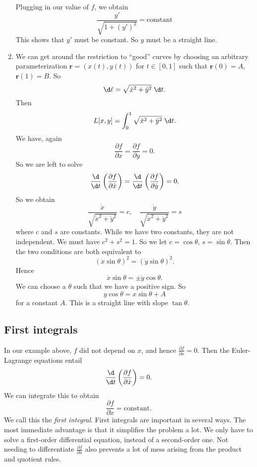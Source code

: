 \documentclass[a4paper]{article}
\begin{document}
\begin{eg}
\begin{enumerate}
      Plugging in our value of $f$, we obtain
      \[
        \frac{y'}{\sqrt{1 + (y')^2}} = \text{constant}
      \]
      This shows that $y'$ must be constant. So $y$ must be a straight line.
    \item We can get around the restriction to ``good'' curves by choosing an arbitrary parameterization $\mathbf{r} = (x(t), y(t))$ for $t\in [0, 1]$ such that $\mathbf{r}(0) = A$, $\mathbf{r}(1) = B$. So
      \[
        \d \ell = \sqrt{\dot x^2 + \dot y^2}\;\d t.
      \]
      Then
      \[
        L[x, y] = \int_0^1 \sqrt{\dot x^2 + \dot y^2} \;\d t.
      \]
      We have, again
      \[
        \frac{\partial f}{\partial x} = \frac{\partial f}{\partial y} = 0.
      \]
      So we are left to solve
      \[
        \frac{\d }{\d t}\left(\frac{\partial f}{\partial \dot x}\right) = \frac{\d }{\d t}\left(\frac{\partial f}{\partial \dot y}\right)  = 0.
      \]
      So we obtain
      \[
        \frac{\dot x}{\sqrt{\dot x^2 + \dot y^2}} = c,\quad \frac{\dot y}{\sqrt{\dot x^2 + \dot y^2}} = s
      \]
      where $c$ and $s$ are constants. While we have two constants, they are not independent. We must have $c^2 + s^2 = 1$. So we let $c = \cos \theta$, $s = \sin \theta$. Then the two conditions are both equivalent to
      \[
        (\dot x \sin \theta)^2 = (\dot y\sin \theta)^2.
      \]
      Hence
      \[
        \dot x \sin \theta = \pm\dot y \cos \theta.
      \]
      We can choose a $\theta$ such that we have a positive sign. So
      \[
        y\cos \theta = x\sin \theta + A
      \]
      for a constant $A$. This is a straight line with slope $\tan \theta$.
  \end{enumerate}
\end{eg}
\subsection{First integrals}
In our example above, $f$ did not depend on $x$, and hence $\frac{\partial f}{\partial x} = 0$. Then the Euler-Lagrange equations entail
\[
  \frac{\d}{\d t}\left(\frac{\partial f}{\partial \dot{x}}\right) = 0.
\]
We can integrate this to obtain
\[
  \frac{\partial f}{\partial \dot{x}} = \text{constant}.
\]
We call this the \emph{first integral}. First integrals are important in several ways. The most immediate advantage is that it simplifies the problem a lot. We only have to solve a first-order differential equation, instead of a second-order one. Not needing to differentiate $\frac{\partial f}{\partial \dot{x}}$ also prevents a lot of mess arising from the product and quotient rules.
\end{document}
